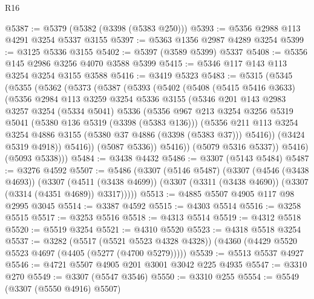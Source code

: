 \begin{lexlean}{R16}
\begin{coremodule}
@5387 := @5379 (@5382 (@3398 (@5383 @250)))
@5393 := @5356 @2988 @113 @4291 @3254 @5337 @3155
@5397 := @5363 @1356 @2987 @4289 @3254
@5399 := @3125 @5336 @3155
@5402 := @5397 (@3589 @5399) @5337
@5408 := @5356 @145 @2986 @3256 @4070 @3588 @5399
@5415 := @5346 @117 @143 @113 @3254 @3254 @3155 @3588
@5416 := @3419 @5323
@5483 := @5315
    (@5345
      (@5355
        (@5362
          (@5373
            (@5387
              (@5393
                (@5402
                  (@5408
                    (@5415 @5416 @3633)
                    (@5356
                      @2984
                      @113
                      @3259
                      @3254
                      @5336
                      @3155
                      (@5346
                        @201
                        @143
                        @2983
                        @3257
                        @3254
                        (@5334 @5041)
                        @5336
                        (@5356
                          @967
                          @213
                          @3254
                          @3256
                          @5319
                          @5041
                          (@5380 @136 @5319 (@3398 (@5383 @136)))
                          (@5356
                            @211
                            @113
                            @3254
                            @3254
                            @4886
                            @3155
                            (@5380 @37 @4886 (@3398 (@5383 @37)))
                            @5416))
                        (@3424 @5319 @4918))
                      @5416))
                  (@5087 @5336))
                @5416))
            (@5079 @5316 @5337))
          @5416)
        (@5093 @5338)))
@5484 := @3438 @4432
@5486 := @3307 (@5143 @5484)
@5487 := @3276 @4592
@5507 := @5486
    (@3307
      (@5146 @5487)
      (@3307
        (@4546 (@3438 @4693))
        (@3307
          (@4511 (@3438 @4699))
          (@3307 (@3311 (@3438 @4690)) (@3307 (@3314 (@4351 @4689)) @3317)))))
@5513 := @4885 @5507 @4905 @117 @98 @2995 @3045
@5514 := @3387 @4592
@5515 := @4303 @5514
@5516 := @3258 @5515
@5517 := @3253 @5516
@5518 := @4313 @5514
@5519 := @4312 @5518
@5520 := @5519 @3254
@5521 := @4310 @5520
@5523 := @4318 @5518 @3254
@5537 := @3282
    (@5517 (@5521 @5523 @4328 @4328))
    (@4360 (@4429 @5520 @5523 @4697 (@4405 (@5277 (@4700 @5279)))))
@5539 := @5513 @5537 @4927
@5546 := @4721 @5507 @4905 @201 @3001 @3042 @225 @4935
@5547 := @3310 @270
@5549 := @3307 (@5547 @3546)
@5550 := @3310 @255
@5554 := @5549 (@3307 (@5550 @4916) @5507)

\end{coremodule}
\end{lexlean}
